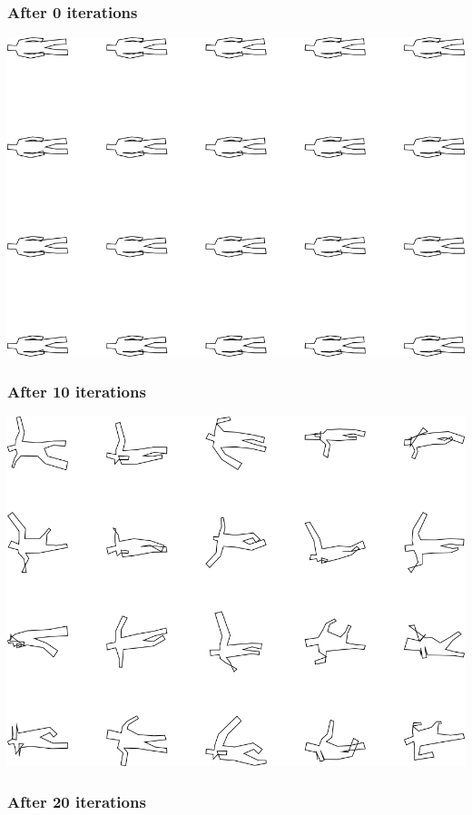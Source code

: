 \subsubsection{After 0 iterations}

\includegraphics[width=6in]{output/3.learning/multi_tuning/multi_tuning_iter0_.png}
\subsubsection{After 10 iterations}

\includegraphics[width=6in]{output/3.learning/multi_tuning/multi_tuning_iter10_.png}
\subsubsection{After 20 iterations}

